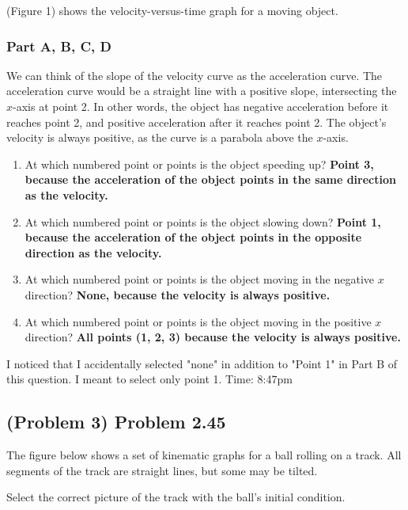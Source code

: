 (Figure 1) shows the velocity-versus-time graph for a moving object.

\subsubsection{Part A, B, C, D}

We can think of the slope of the velocity curve as the acceleration curve. The acceleration curve would be a straight line with a positive slope, intersecting the $x$-axis at point 2. In other words, the object has negative acceleration before it reaches point 2, and positive acceleration after it reaches point 2. The object's velocity is always positive, as the curve is a parabola above the $x$-axis.

\begin{enumerate}[label=\alph*.]
	\item At which numbered point or points is the object speeding up? \textbf{Point 3, because the acceleration of the object points in the same direction as the velocity.}
	\item At which numbered point or points is the object slowing down? \textbf{Point 1, because the acceleration of the object points in the opposite direction as the velocity.}
	\item At which numbered point or points is the object moving in the negative $x$ direction? \textbf{None, because the velocity is always positive.}
	\item At which numbered point or points is the object moving in the positive $x$ direction? \textbf{All points (1, 2, 3) because the velocity is always positive.}
\end{enumerate}

\begin{remark}
	I noticed that I accidentally selected "none" in addition to "Point 1" in Part B of this question. I meant to select only point 1. Time: 8:47pm
\end{remark}

\newpage

\subsection{(Problem 3) Problem 2.45}

The figure below shows a set of kinematic graphs for a ball rolling on a track. All segments of the track are straight lines, but some may be tilted.

Select the correct picture of the track with the ball's initial condition.

